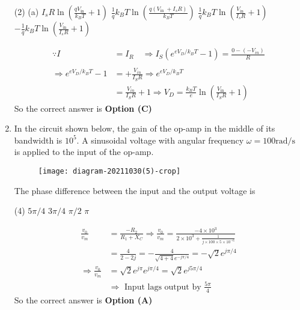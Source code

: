 \begin{enumerate}
	{	}
	\begin{tasks}(2)
		\task[\textbf{A.}] (a) $I_{s} R \ln \left(\frac{q V_{\text {in }}}{k_{B} T}+1\right)$
		\task[\textbf{B.}] $\frac{1}{q} k_{B} T \ln \left(\frac{q\left(V_{\text {in }}+I_{s} R\right)}{k_{B} T}\right)$
		\task[\textbf{C.}]  $\frac{1}{q} k_{B} T \ln \left(\frac{V_{\text {in }}}{I_{s} R}+1\right)$
		\task[\textbf{D.}]  $-\frac{1}{q} k_{B} T \ln \left(\frac{V_{\text {in }}}{I_{s} R}+1\right)$
	\end{tasks}
\begin{answer}
	\begin{align*}
	\because I&=I_{R} \quad \Rightarrow I_{S}\left(e^{e V_{D} / k_{B} T}-1\right)=\frac{0-\left(-V_{i n}\right)}{R}\\
	\\\Rightarrow e^{e V_{D} / k_{B} T}-1&=+\frac{V_{i n}}{I_{S} R} \Rightarrow e^{e V_{D} / k_{B} T}\\&=\frac{V_{i n}}{I_{S} R}+1 \Rightarrow V_{D}=\frac{k_{B} T}{e} \ln \left(\frac{V_{\text {in }}}{I_{S} R}+1\right)
	\end{align*}
	So the correct answer is \textbf{Option (C)}
\end{answer}
	\item In the circuit shown below, the gain of the op-amp in the middle of its bandwidth is $10^{5}$. A sinusoidal voltage with angular frequency $\omega=100 \mathrm{rad} / \mathrm{s}$ is applied to the input of the op-amp.\\
	\begin{figure}[H]
		\centering
		\texttt{[image: diagram-20211030(5)-crop]}
		\caption{}
		\label{}
	\end{figure}
	The phase difference between the input and the output voltage is
	{	}
	\begin{tasks}(4)
		\task[\textbf{A.}]  $5 \pi / 4$
		\task[\textbf{B.}] $3 \pi / 4$
		\task[\textbf{C.}] $\pi / 2$
		\task[\textbf{D.}] $\pi$
	\end{tasks}
\begin{answer}
	\begin{align*}
	\frac{v_{0}}{v_{m}}&=\frac{-R_{2}}{R_{1}+X_{C}} \Rightarrow \frac{v_{0}}{v_{m}}=\frac{-4 \times 10^{3}}{2 \times 10^{3}+\frac{1}{j \times 100 \times 5 \times 10^{-6}}}\\&=\frac{4}{2-2 j}=-\frac{4}{\sqrt{4+4} e^{-j \pi / 4}}=-\sqrt{2} e^{j \pi / 4}\\
	\Rightarrow \frac{v_{0}}{v_{m}}&=\sqrt{2} e^{j \pi} e^{j \pi / 4}=\sqrt{2} e^{j 5 \pi / 4}\\
	&\Rightarrow\text{ Input lags output by }\frac{5 \pi}{4}
	\end{align*}
	So the correct answer is \textbf{Option (A)}
\end{answer}
\end{enumerate}
